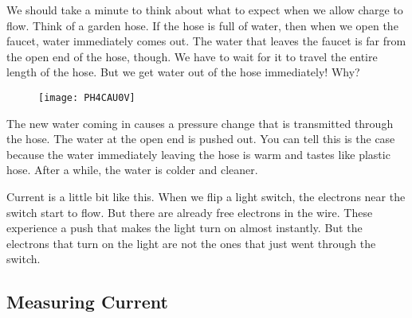 We should take a minute to think about what to expect when we allow charge
to flow. Think of a garden hose. If the hose is full of water, then when we
open the faucet, water immediately comes out. The water that leaves the
faucet is far from the open end of the hose, though. We have to wait for it
to travel the entire length of the hose. But we get water out of the hose
immediately! Why? \begin{figure}[h!]
\texttt{[image: PH4CAU0V]}
\end{figure}The new water coming in causes a
pressure change that is transmitted through the hose. The water at the open
end is pushed out. You can tell this is the case because the water
immediately leaving the hose is warm and tastes like plastic hose. After a
while, the water is colder and cleaner.

Current is a little bit like this. When we flip a light switch, the
electrons near the switch start to flow. But there are already free
electrons in the wire. These experience a push that makes the light turn on
almost instantly. But the electrons that turn on the light are not the ones
that just went through the switch.

\subsection{Measuring Current}

